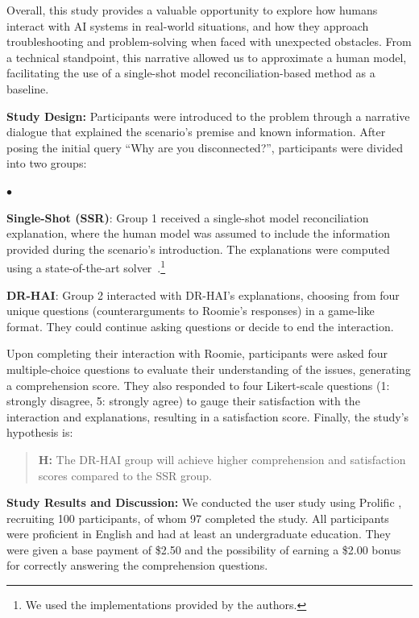\documentclass{ecai}
\newcommand{\squishlist}{
\begin{list}{$\bullet$}{ 
    \setlength{\itemsep}{1pt}
    \setlength{\parsep}{0pt}
    \setlength{\topsep}{1.5pt}
    \setlength{\partopsep}{0pt}
    \setlength{\leftmargin}{1em}
    \setlength{\labelwidth}{1em}
    \setlength{\labelsep}{0.5em} } }
\newcommand{\squishend}{\end{list}  }
\begin{document}
Overall, this study provides a valuable opportunity to explore how humans interact with AI systems in real-world situations, and how they approach troubleshooting and problem-solving when faced with unexpected obstacles. From a technical standpoint, this narrative allowed us to approximate a human model, facilitating the use of a single-shot model reconciliation-based method as a baseline. 



\smallskip \noindent \textbf{Study Design:}
Participants were introduced to the problem through a narrative dialogue that explained the scenario's premise and known information. After posing the initial query ``Why are you disconnected?'', participants were divided into two groups:
\squishlist
    \item \textbf{Single-Shot (SSR)}: Group 1 received a single-shot model reconciliation explanation, where the human model was assumed to include the information provided during the scenario's introduction. The explanations were computed using a state-of-the-art solver~\cite{vas21}.\footnote{We used the implementations provided by the authors.} 

    \item \textbf{DR-HAI}: Group 2 interacted with DR-HAI's explanations, choosing from four unique questions (counterarguments to Roomie's responses) in a game-like format. They could continue asking questions or decide to end the interaction.

\squishend

Upon completing their interaction with Roomie, participants were asked four multiple-choice questions to evaluate their understanding of the issues, generating a comprehension score. They also responded to four Likert-scale questions (1: strongly disagree, 5: strongly agree) to gauge their satisfaction with the interaction and explanations, resulting in a satisfaction score. Finally, the study's hypothesis is:




\begin{quote}
\textbf{H:} The DR-HAI group will achieve higher comprehension and satisfaction scores compared to the SSR group.
\end{quote}




 \noindent \textbf{Study Results and Discussion:}
We conducted the user study using Prolific \cite{palan2018prolific}, recruiting 100 participants, of whom 97 completed the study. All participants were proficient in English and had at least an undergraduate education. They were given a base payment of \$2.50 and the possibility of earning a \$2.00 bonus for correctly answering the comprehension questions.
\end{document}
